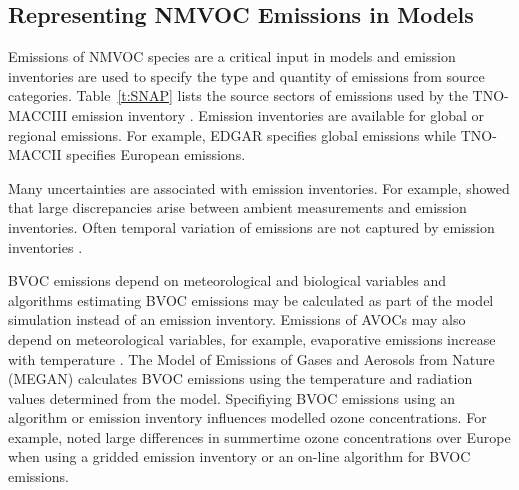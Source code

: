 \vspace{-6mm}
\subsection{Representing NMVOC Emissions in Models}
\vspace{-2mm}
Emissions of NMVOC species are a critical input in models and emission inventories are used to specify the type and quantity of emissions from source categories.
Table~\ref{t:SNAP} lists the source sectors of emissions used by the TNO-MACCIII emission inventory \citep{Kuenen:2014}.
Emission inventories are available for global or regional emissions.
For example, EDGAR \citep{Olivier:2001} specifies global emissions while TNO-MACCII \citep{Kuenen:2014} specifies European emissions.

Many uncertainties are associated with emission inventories.
For example, \citet{Coll:2010} showed that large discrepancies arise between ambient measurements and emission inventories.
Often temporal variation of emissions are not captured by emission inventories \citep{Boynard:2014}. 

BVOC emissions depend on meteorological and biological variables and algorithms estimating BVOC emissions may be calculated as part of the model simulation instead of an emission inventory.
Emissions of AVOCs may also depend on meteorological variables, for example, evaporative emissions increase with temperature \citep{Rubin:2006}.
The Model of Emissions of Gases and Aerosols from Nature (MEGAN) \citep{Guenther:2006, Guenther:2012} calculates BVOC emissions using the temperature and radiation values determined from the model.
Specifiying BVOC emissions using an algorithm or emission inventory influences modelled ozone concentrations. 
For example, \citet{Curci:2009} noted large differences in summertime ozone concentrations over Europe when using a gridded emission inventory or an on-line algorithm for BVOC emissions.

